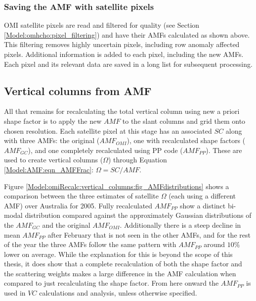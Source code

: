     
    \subsubsection{Saving the AMF with satellite pixels}
      
      OMI satellite pixels are read and filtered for quality (see Section \ref{Model:omhcho:pixel_filtering}) and have their AMFs calculated as shown above. 
      This filtering removes highly uncertain pixels, including row anomaly affected pixels.
      Additional information is added to each pixel, including the new AMFs.
      Each pixel and its relevant data are saved in a long list for subsequent processing.
    
  \subsection{Vertical columns from AMF}
    \label{Model:omiRecalc:vertical_columns}
    All that remains for recalculating the total vertical column using  new a priori shape factor is to apply the new $AMF$ to the slant columns and grid them onto  chosen resolution.
    Each satellite pixel at this stage has an associated $SC$ along with three AMFs: the original ($AMF_{OMI}$), one with recalculated shape factors ($AMF_{GC}$), and one completely recalculated using PP code ($AMF_{PP}$).
    These are used to create vertical columns ($\Omega$) through Equation \ref{Model:AMF:eqn_AMFFrac}: $\Omega = SC/AMF$.
    
    Figure \ref{Model:omiRecalc:vertical_columns:fig_AMFdistributions} shows a comparison between the three estimates of satellite $\Omega$ (each using a different AMF) over Australia for 2005. 
    Fully recalculated $AMF_{PP}$ show a distinct bi-modal distribution compared against the approximately Gaussian distributions of the $AMF_{GC}$ and the original $AMF_{OMI}$.
    Additionally there is a steep decline in mean $AMF_{PP}$ after February that is not seen in the other AMFs, and for the rest of the year the three AMFs follow the same pattern with $AMF_{PP}$ around $10\%$ lower on average.
    While the explanation for this is beyond the scope of this thesis, it does show that a complete recalculation of both the shape factor and the scattering weights makes a large difference in the AMF calculation when compared to just recalculating the shape factor.
    From here onward the $AMF_{PP}$ is used in $VC$ calculations and analysis, unless otherwise specified.
    
